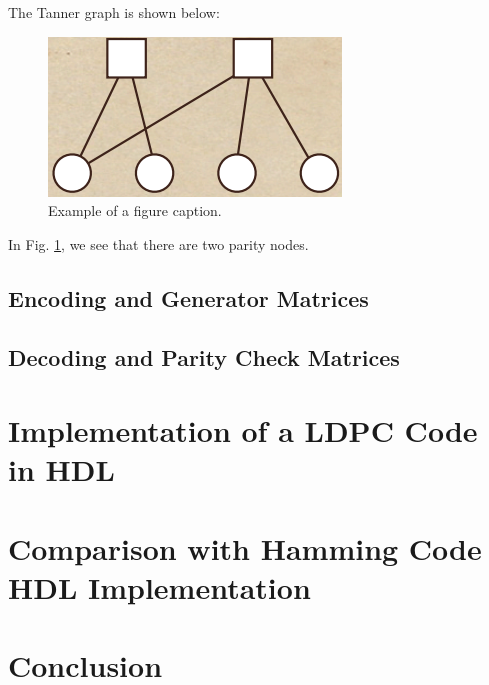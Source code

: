 \documentclass[conference]{IEEEtran}
\begin{document}
The Tanner graph is shown below:

\begin{figure}[htbp]
\centerline{\includegraphics{Images/tanner_graph.png}}
\caption{Example of a figure caption.}
\label{fig}
\end{figure}

In Fig. \ref{fig}, we see that there are two parity nodes.

\subsection{Encoding and Generator Matrices}

\subsection{Decoding and Parity Check Matrices}

\section{Implementation of a LDPC Code in HDL}

\section{Comparison with Hamming Code HDL Implementation}

\section{Conclusion}


\end{document}
